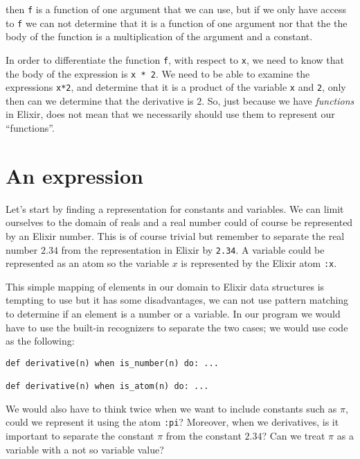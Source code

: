 \documentclass[a4paper,11pt]{article}
\begin{document}
\noindent then {\tt f} is a function of one argument that we can use, but if we
only have access to {\tt f} we can not determine that it is a function
of one argument nor that the the body of the function is a
multiplication of the argument and a constant.

In order to differentiate the function {\tt f}, with respect to {\tt x}, we
need to know that the body of the expression is {\tt x * 2}. We need to
be able to examine the expressions {\tt x*2}, and determine that it is
a product of the variable {\tt x} and {\tt 2}, only then can we
determine that the derivative is $2$. So, just because we have {\em
    functions} in Elixir, does not mean that we necessarily should use
them to represent our ``functions''.



\section{An expression}

Let's start by finding a representation for constants and
variables. We can limit ourselves to the domain of reals and a real
number could of course be represented by an Elixir number. This is of
course trivial but remember to separate the real number $2.34$ from the
representation in Elixir by {\tt 2.34}. A variable could be represented
as an atom so the variable $x$ is represented by the Elixir atom {\tt :x}.

This simple mapping of elements in our domain to Elixir data structures
is tempting to use but it has some disadvantages, we can not use
pattern matching to determine if an element is a number or a
variable. In our program we would have to use the built-in recognizers
to separate the two cases; we would use code as the following:

\begin{verbatim}
def derivative(n) when is_number(n) do: ...

def derivative(n) when is_atom(n) do: ...
\end{verbatim}

We would also have to think twice when we want to include constants
such as $\pi$, could we represent it using the atom {\tt :pi}?
Moreover, when we derivatives, is it important to separate the
constant $\pi$ from the constant $2.34$? Can we treat $\pi$ as a variable with a not so variable value? 
\end{document}
